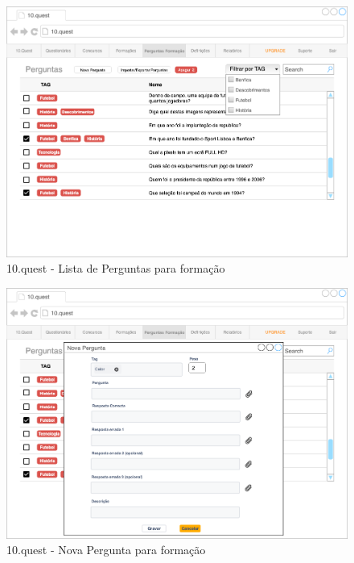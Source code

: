 \begin{figure}[ht!]
	\begin{center}
		\includegraphics[width=1\textwidth]{img/prototipos/6.png}
		\caption{10.quest - Lista de Perguntas para formação}
		\label{10q-perguntasL}
	\end{center}
\end{figure}

\pagebreak

\begin{figure}[ht!]
	\begin{center}
		\includegraphics[width=1\textwidth]{img/prototipos/7.png}
		\caption{10.quest - Nova Pergunta para formação}
		\label{10q-NperguntaF}
	\end{center}
\end{figure}



